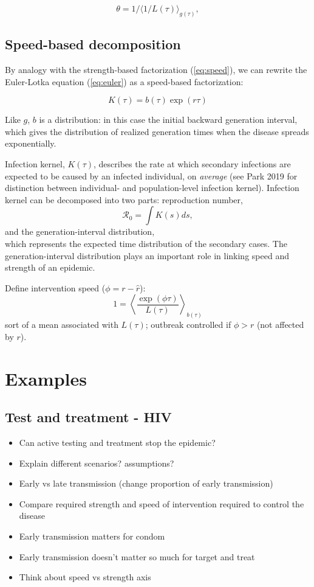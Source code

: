 \documentclass{article}\usepackage[]{graphicx}\usepackage[]{color}
\newcommand{\Rx}[1]{\ensuremath{{\mathcal R}_{#1}}}
\newcommand{\Ro}{\Rx{0}}
\newcommand{\eqref}[1]{(\ref{eq:#1})}
\begin{document}
\begin{equation}
	\theta = 1/\langle 1/L(\tau) \rangle_{g(\tau)},
\end{equation}

\subsection{Speed-based decomposition}

By analogy with the strength-based factorization \eqref{speed}, we can rewrite the Euler-Lotka equation \eqref{euler} as a speed-based factorization:

\begin{equation}
K(\tau) = b(\tau)\exp(r\tau)
\end{equation}

Like $g$, $b$ is a distribution: in this case the initial backward generation interval, which gives the distribution of realized generation times when the disease spreads exponentially.

Infection kernel, $K(\tau)$, describes the rate at which secondary infections are 
expected to be caused by an infected individual, on \emph{average} (see Park 2019
for distinction between individual- and population-level infection kernel). Infection
kernel can be decomposed into two parts: reproduction number, 
$$
\Ro = \int K(s) ds,
$$ 
and the generation-interval distribution, 
$$
$$
which represents the expected time distribution of the secondary cases. The 
generation-interval distribution plays an important role in linking speed and
strength of an epidemic.


	Define intervention speed ($\phi = r - \hat r$):
	$$
	1 = \left\langle \frac{\exp(\phi \tau) }{L(\tau)} \right\rangle_{b(\tau)}
	$$
	sort of a mean associated with $L(\tau)$; outbreak controlled if $\phi > r$ (not affected by $r$).


\section{Examples}

\subsection{Test and treatment - HIV}

\begin{itemize}
	\item Can active testing and treatment stop the epidemic?
	\item Explain different scenarios? assumptions?
	\item Early vs late transmission (change proportion of early transmission)
	\item Compare required strength and speed of intervention required to control the disease
	\item Early transmission matters for condom
	\item Early transmission doesn't matter so much for target and treat
	\item Think about speed vs strength axis
\end{itemize}
\end{document}
